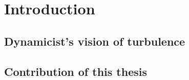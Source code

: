 \begin{preliminary}

    \ifpaper               %
    \begin{dedication}
        
    \end{dedication}
    \fi

%        

    \begin{acknowledgements}
        
    \end{acknowledgements}

    \contents

    \begin{summary}
        
    \end{summary}

\end{preliminary}


\ifboyscout \pagestyle{headings} \fi  %

\chapter{Introduction}
%

    \section{Dynamicist's vision of turbulence}
    \label{s:hopf}
    

    \section{Contribution of this thesis}
    \label{s:thesisIntro}
	

